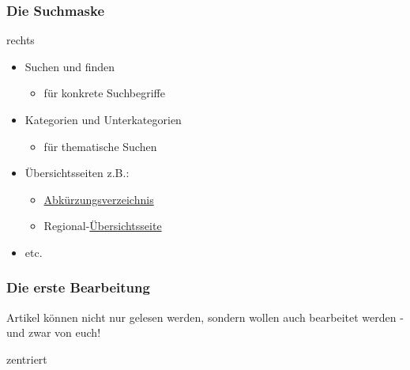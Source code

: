 \documentclass{beamer}
\begin{document}
\begin{frame}
  \frametitle{Die Suchmaske}

  rechts

  \begin{itemize}
    \item Suchen und finden
    \begin{itemize}
      \item für konkrete Suchbegriffe
    \end{itemize}
    \item Kategorien und Unterkategorien
    \begin{itemize}
      \item für thematische Suchen
    \end{itemize}
    \item Übersichtsseiten z.B.:
    \begin{itemize}
      \item \href{http://wiki.stura.htw-dresden.de/index.php/Kategorie:Abk\%C3\%BCrzung}{Abkürzungsverzeichnis}
      \item Regional-\href{http://food.the-empire.de/index.php/Hauptseite}{Übersichtsseite}
    \end{itemize}
    \item etc.
  \end{itemize}
\end{frame}


\begin{frame}
  \frametitle{Die erste Bearbeitung}
  Artikel können nicht nur gelesen werden, sondern wollen auch bearbeitet
  werden - und zwar von euch!

  zentriert

\end{frame}
\end{document}
